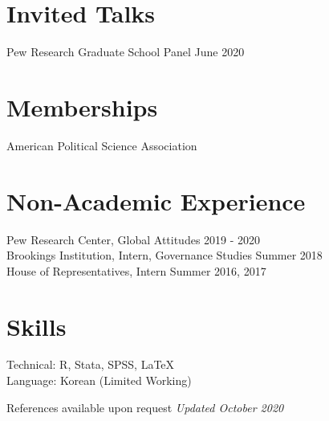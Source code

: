\documentclass[margin, line]{res}
\begin{document}
\begin{resume}
\section{Invited Talks}
Pew Research Graduate School Panel \hfill June 2020

\section{Memberships}
American Political Science Association

\section{Non-Academic Experience}
Pew Research Center, Global Attitudes \hfill 2019 - 2020\\
Brookings Institution, Intern, Governance Studies \hfill Summer 2018\\
House of Representatives, Intern \hfill Summer 2016, 2017

\section{Skills} 
Technical: R, Stata, SPSS, \LaTeX\\
Language: Korean (Limited Working)

\small{References available upon request} \hfill \small{\textit{Updated October 2020}}

\end{resume}
\end{document}
